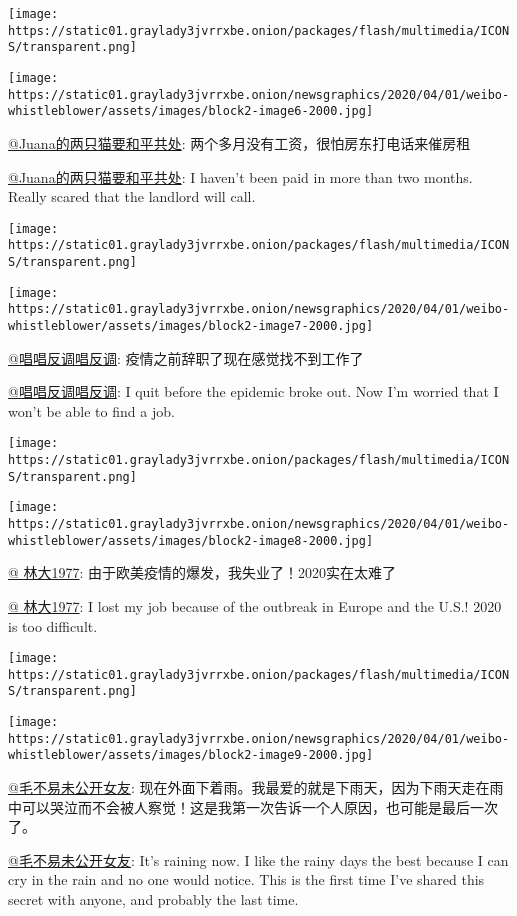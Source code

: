 \texttt{[image: https://static01.graylady3jvrrxbe.onion/packages/flash/multimedia/ICONS/transparent.png]}

\texttt{[image: https://static01.graylady3jvrrxbe.onion/newsgraphics/2020/04/01/weibo-whistleblower/assets/images/block2-image6-2000.jpg]}

\href{https://www.weibo.com/jaybeealwayspositive}{@Juana的两只猫要和平共处}:
两个多月没有工资，很怕房东打电话来催房租

\href{https://www.weibo.com/jaybeealwayspositive}{@Juana的两只猫要和平共处}:
I haven't been paid in more than two months. Really scared that the
landlord will call.

\texttt{[image: https://static01.graylady3jvrrxbe.onion/packages/flash/multimedia/ICONS/transparent.png]}

\texttt{[image: https://static01.graylady3jvrrxbe.onion/newsgraphics/2020/04/01/weibo-whistleblower/assets/images/block2-image7-2000.jpg]}

\href{https://www.weibo.com/u/6583197253}{@唱唱反调唱反调}:
疫情之前辞职了现在感觉找不到工作了

\href{https://www.weibo.com/u/6583197253}{@唱唱反调唱反调}: I quit
before the epidemic broke out. Now I'm worried that I won't be able to
find a job.

\texttt{[image: https://static01.graylady3jvrrxbe.onion/packages/flash/multimedia/ICONS/transparent.png]}

\texttt{[image: https://static01.graylady3jvrrxbe.onion/newsgraphics/2020/04/01/weibo-whistleblower/assets/images/block2-image8-2000.jpg]}

\href{https://www.weibo.com/u/7385672360}{@ 林大1977}:
由于欧美疫情的爆发，我失业了！2020实在太难了

\href{https://www.weibo.com/u/7385672360}{@ 林大1977}: I lost my job
because of the outbreak in Europe and the U.S.! 2020 is too difficult.

\texttt{[image: https://static01.graylady3jvrrxbe.onion/packages/flash/multimedia/ICONS/transparent.png]}

\texttt{[image: https://static01.graylady3jvrrxbe.onion/newsgraphics/2020/04/01/weibo-whistleblower/assets/images/block2-image9-2000.jpg]}

\href{https://www.weibo.com/u/6224326911}{@毛不易未公开女友}:
现在外面下着雨。我最爱的就是下雨天，因为下雨天走在雨中可以哭泣而不会被人察觉！这是我第一次告诉一个人原因，也可能是最后一次了。

\href{https://www.weibo.com/u/6224326911}{@毛不易未公开女友}: It's
raining now. I like the rainy days the best because I can cry in the
rain and no one would notice. This is the first time I've shared this
secret with anyone, and probably the last time.

